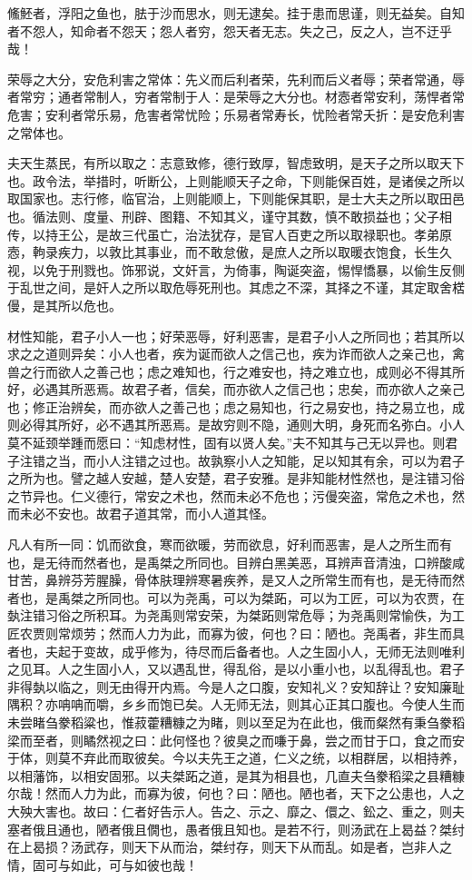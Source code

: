 \documentclass[]{article}
\begin{document}
鯈魾者，浮阳之鱼也，胠于沙而思水，则无逮矣。挂于患而思谨，则无益矣。自知者不怨人，知命者不怨天；怨人者穷，怨天者无志。失之己，反之人，岂不迂乎哉！

荣辱之大分，安危利害之常体：先义而后利者荣，先利而后义者辱；荣者常通，辱者常穷；通者常制人，穷者常制于人：是荣辱之大分也。材悫者常安利，荡悍者常危害；安利者常乐易，危害者常忧险；乐易者常寿长，忧险者常夭折：是安危利害之常体也。

夫天生蒸民，有所以取之：志意致修，德行致厚，智虑致明，是天子之所以取天下也。政令法，举措时，听断公，上则能顺天子之命，下则能保百姓，是诸侯之所以取国家也。志行修，临官治，上则能顺上，下则能保其职，是士大夫之所以取田邑也。循法则、度量、刑辟、图籍、不知其义，谨守其数，慎不敢损益也；父子相传，以持王公，是故三代虽亡，治法犹存，是官人百吏之所以取禄职也。孝弟原悫，軥录疾力，以敦比其事业，而不敢怠傲，是庶人之所以取暖衣饱食，长生久视，以免于刑戮也。饰邪说，文奸言，为倚事，陶诞突盗，惕悍憍暴，以偷生反侧于乱世之间，是奸人之所以取危辱死刑也。其虑之不深，其择之不谨，其定取舍楛僈，是其所以危也。

材性知能，君子小人一也；好荣恶辱，好利恶害，是君子小人之所同也；若其所以求之之道则异矣：小人也者，疾为诞而欲人之信己也，疾为诈而欲人之亲己也，禽兽之行而欲人之善己也；虑之难知也，行之难安也，持之难立也，成则必不得其所好，必遇其所恶焉。故君子者，信矣，而亦欲人之信己也；忠矣，而亦欲人之亲己也；修正治辨矣，而亦欲人之善己也；虑之易知也，行之易安也，持之易立也，成则必得其所好，必不遇其所恶焉。是故穷则不隐，通则大明，身死而名弥白。小人莫不延颈举踵而愿曰：``知虑材性，固有以贤人矣。''夫不知其与己无以异也。则君子注错之当，而小人注错之过也。故孰察小人之知能，足以知其有余，可以为君子之所为也。譬之越人安越，楚人安楚，君子安雅。是非知能材性然也，是注错习俗之节异也。仁义德行，常安之术也，然而未必不危也；污僈突盗，常危之术也，然而未必不安也。故君子道其常，而小人道其怪。

凡人有所一同：饥而欲食，寒而欲暖，劳而欲息，好利而恶害，是人之所生而有也，是无待而然者也，是禹桀之所同也。目辨白黑美恶，耳辨声音清浊，口辨酸咸甘苦，鼻辨芬芳腥臊，骨体肤理辨寒暑疾养，是又人之所常生而有也，是无待而然者也，是禹桀之所同也。可以为尧禹，可以为桀跖，可以为工匠，可以为农贾，在埶注错习俗之所积耳。为尧禹则常安荣，为桀跖则常危辱；为尧禹则常愉佚，为工匠农贾则常烦劳；然而人力为此，而寡为彼，何也？曰：陋也。尧禹者，非生而具者也，夫起于变故，成乎修为，待尽而后备者也。人之生固小人，无师无法则唯利之见耳。人之生固小人，又以遇乱世，得乱俗，是以小重小也，以乱得乱也。君子非得埶以临之，则无由得开内焉。今是人之口腹，安知礼义？安知辞让？安知廉耻隅积？亦呥呥而嚼，乡乡而饱已矣。人无师无法，则其心正其口腹也。今使人生而未尝睹刍豢稻粱也，惟菽藿糟糠之为睹，则以至足为在此也，俄而粲然有秉刍豢稻梁而至者，则瞲然视之曰：此何怪也？彼臭之而嗛于鼻，尝之而甘于口，食之而安于体，则莫不弃此而取彼矣。今以夫先王之道，仁义之统，以相群居，以相持养，以相藩饰，以相安固邪。以夫桀跖之道，是其为相县也，几直夫刍豢稻梁之县糟糠尔哉！然而人力为此，而寡为彼，何也？曰：陋也。陋也者，天下之公患也，人之大殃大害也。故曰：仁者好告示人。告之、示之、靡之、儇之、鈆之、重之，则夫塞者俄且通也，陋者俄且僩也，愚者俄且知也。是若不行，则汤武在上曷益？桀纣在上曷损？汤武存，则天下从而治，桀纣存，则天下从而乱。如是者，岂非人之情，固可与如此，可与如彼也哉！
\end{document}
